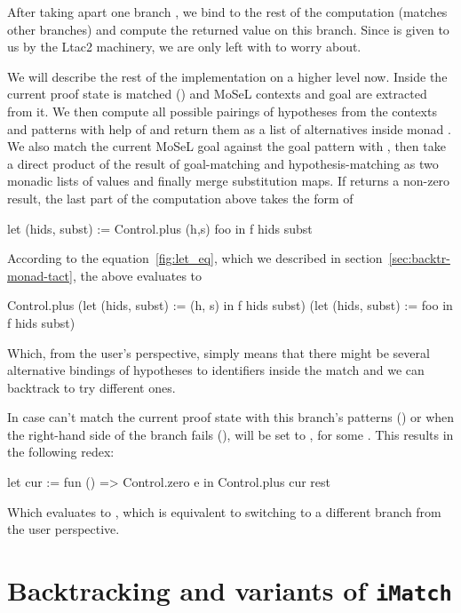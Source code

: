 After taking apart one branch , we bind  to the rest of the computation (matches other branches) and compute the returned value on this branch.
Since  is given to us by the Ltac2 machinery, we are only left with  to worry about.

We will describe the rest of the implementation on a higher level now.
Inside  the current proof state is matched () and MoSeL contexts and goal are extracted from it.
We then compute all possible pairings of hypotheses from the contexts and patterns with help of  and return them as a list of alternatives inside monad .
We also match the current MoSeL goal against the goal pattern  with , then take a direct product of the result of goal-matching and hypothesis-matching as two monadic lists of values and finally merge substitution maps.
If  returns a non-zero result, the last part of the computation above takes the form of
\begin{coq}
let (hids, subst) := Control.plus (h,s) foo in
f hids subst
\end{coq}

According to the equation~\ref{fig:let_eq}, which we described in section~\ref{sec:backtr-monad-tact}, the above evaluates to
\begin{coq}
Control.plus
  (let (hids, subst) := (h, s) in
   f hids subst)
  (let (hids, subst) := foo in
   f hids subst)
\end{coq}

Which, from the user's perspective, simply means that there might be several alternative bindings of hypotheses to identifiers inside the match and we can backtrack to try different ones.

In case  can't match the current proof state with this branch's patterns () or when the right-hand side of the branch fails (),  will be set to , for some .
This results in the following redex:
\begin{coq}
let cur := fun () => Control.zero e
in Control.plus cur rest
\end{coq}
Which evaluates to , which is equivalent to switching to a different branch from the user perspective.

\section{Backtracking and variants of \texttt{iMatch}}

